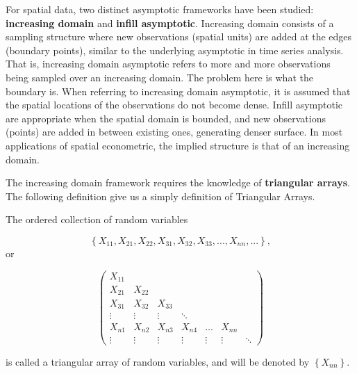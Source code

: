 For spatial data, two distinct asymptotic frameworks have been studied: \textbf{increasing domain} and \textbf{infill asymptotic}. Increasing domain consists of a sampling structure where new observations (spatial units) are added at the edges (boundary points), similar to the underlying asymptotic in time series analysis. That is, increasing domain asymptotic refers to more and more observations being sampled over an increasing domain. The problem here is what the boundary is. When referring to increasing domain asymptotic, it is assumed that the spatial locations of the observations do not become dense. Infill asymptotic are appropriate when the spatial domain is bounded, and new observations (points) are added in between existing ones, generating denser surface. In most applications of spatial econometric, the implied structure is that of an increasing domain. 

The increasing domain framework requires the knowledge of \textbf{triangular arrays}.  The following definition give us a simply definition of Triangular Arrays. 

\begin{definition}\label{def:triangular-array} 
The ordered collection of random variables 

\begin{equation*}
\left\lbrace X_{11}, X_{21}, X_{22}, X_{31}, X_{32}, X_{33}, ... , X_{nn}, ...\right\rbrace,
\end{equation*}
%
or

\begin{equation*}
\begin{pmatrix}
X_{11} &        &        &        &        &        & \\
X_{21} & X_{22} &        &        &        &        & \\
X_{31} & X_{32} & X_{33} &        &        &        & \\
\vdots & \vdots & \vdots & \ddots &        &        & \\
X_{n1} & X_{n2} & X_{n3} & X_{n4} & \hdots & X_{nn} & \\
\vdots & \vdots & \vdots & \vdots & \vdots & \vdots & \ddots
\end{pmatrix}
\end{equation*}

is called a triangular array of random variables, and will be denoted by $\left\lbrace X_{nn}\right\rbrace$.
\end{definition}

